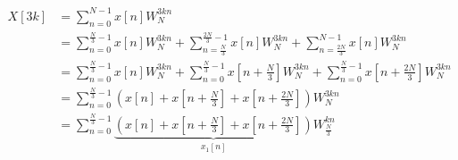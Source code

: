 \documentclass{article}
\begin{document}
\subsection{}

\begin{align}
    X[3k] &= \sum_{n = 0}^{N - 1} x[n] W_N^{3kn} \\
    &= \sum_{n = 0}^{\frac{N}{3} - 1} x[n] W_N^{3kn} + \sum_{n = \frac{N}{3}}^{\frac{2N}{3} - 1} x[n] W_N^{3kn} + \sum_{n = \frac{2N}{3}}^{N - 1} x[n] W_N^{3kn} \\
    &= \sum_{n = 0}^{\frac{N}{3} - 1} x[n] W_N^{3kn} + \sum_{n = 0}^{\frac{N}{3} - 1} x\left[n + \frac{N}{3}\right] W_N^{3kn} + \sum_{n = 0}^{\frac{N}{3} - 1} x\left[n + \frac{2N}{3}\right] W_N^{3kn} \\
    &= \sum_{n = 0}^{\frac{N}{3} - 1} \left(x[n] + x\left[n + \frac{N}{3}\right] + x\left[n + \frac{2N}{3}\right]\right) W_N^{3kn} \\
    &= \sum_{n = 0}^{\frac{N}{3} - 1} \underbrace{\left(x[n] + x\left[n + \frac{N}{3}\right] + x\left[n + \frac{2N}{3}\right]\right)}_{x_1[n]} W_{\frac{N}{3}}^{kn}
\end{align}

\subsection{}
\end{document}
